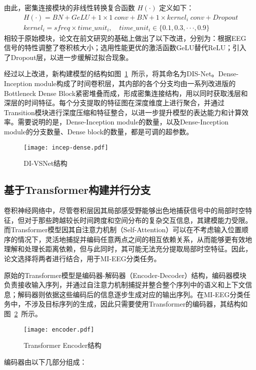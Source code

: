 由此，密集连接模块的非线性转换复合函数 \(H(·)\) 定义如下：
\begin{equation}\label{eq:dense-kernel}
    \begin{split}
      &H(·) = BN + GeLU + 1\times1\;conv + BN +  1 \times kernel_i\;conv + Dropout \\
      &kernel_i = sfreq \times time\_unit_i, \quad time\_unit_i \in \{0.1, 0.3, ···, 0.9\}
    \end{split}
\end{equation}
相较于原始模块，论文在前文研究的基础上做出了以下改进，分别为：根据EEG信号的特性调整了卷积核大小；选用性能更优的激活函数GeLU替代ReLU；引入了Dropout层，以进一步缓解过拟合现象。

经过以上改进，新构建模型的结构如图~\ref{fig:incep-dense}~所示，将其命名为DIS-Net。Dense-Inception module构成了时间卷积层，其内部的各个分支均由一系列改进版的Bottleneck Dense Block紧密堆叠而成，形成密集连接结构，用以同时获取浅层和深层的时间特征。每个分支提取的特征图在深度维度上进行聚合，并通过Transition模块进行深度压缩和特征整合，以进一步提升模型的表达能力和计算效率。需要说明的是，Dense-Inception module的数量，以及Dense-Inception module的分支数量、Dense block的数量，都是可调的超参数。
\begin{figure}
  \centering
  \texttt{[image: incep-dense.pdf]}
  \caption{DI-VSNet结构}
  \label{fig:incep-dense}
\end{figure}

\subsection{基于Transformer构建并行分支}

卷积神经网络中，尽管卷积层因其局部感受野能够出色地捕获信号中的局部时空特征，但对于那些跨越较长时间跨度和空间分布的复杂交互信息，其建模能力受限。而Transformer模型\cite{vaswani2017attention}因其自注意力机制（Self-Attention）可以在不考虑输入位置顺序的情况下，灵活地捕捉并编码任意两点之间的相互依赖关系，从而能够更有效地理解和处理长距离依赖，但与此同时，其可能无法充分提取局部时空特征。因此，论文选择将两者进行结合，用于MI-EEG分类任务。

原始的Transformer模型是编码器-解码器（Encoder-Decoder）结构，编码器模块负责接收输入序列，并通过自注意力机制捕捉并整合整个序列中的语义和上下文信息；解码器则依据这些编码后的信息逐步生成对应的输出序列。在MI-EEG分类任务中，不涉及目标序列的生成，因此只需要使用Transformer的编码器，其结构如图~\ref{fig:encoder}~所示。
\begin{figure}
    \centering
    \texttt{[image: encoder.pdf]}
    \caption{Transformer Encoder结构}
    \label{fig:encoder}
\end{figure}
编码器由以下几部分组成：


